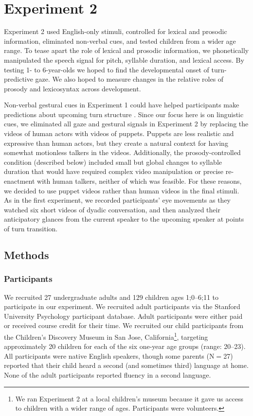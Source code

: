\documentclass[authoryear, 12pt]{elsarticle}
\begin{document}
\section*{Experiment 2}
\label{sec:exp2}

Experiment 2 used English-only stimuli, controlled for lexical and prosodic information, eliminated non-verbal cues, and tested children from a wider age range. To tease apart the role of lexical and prosodic information, we phonetically manipulated the speech signal for pitch, syllable duration, and lexical access. By testing 1- to 6-year-olds we hoped to find the developmental onset of turn-predictive gaze. We also hoped to measure changes in the relative roles of prosody and lexicosyntax across development.

Non-verbal gestural cues in Experiment 1 could have helped participants make predictions about upcoming turn structure \citep{rossano2009, stivers2010}. Since our focus here is on linguistic cues, we eliminated all gaze and gestural signals in Experiment 2 by replacing the videos of human actors with videos of puppets. Puppets are less realistic and expressive than human actors, but they create a natural context for having somewhat motionless talkers in the videos. Additionally, the prosody-controlled condition (described below) included small but global changes to syllable duration that would have required complex video manipulation or precise re-enactment with human talkers, neither of which was feasible. For these reasons, we decided to use puppet videos rather than human videos in the final stimuli. As in the first experiment, we recorded participants' eye movements as they watched six short videos of dyadic conversation, and then analyzed their anticipatory glances from the current speaker to the upcoming speaker at points of turn transition.

\subsection*{Methods}
\label{sec:methods2}

\subsubsection*{Participants}
We recruited 27 undergraduate adults and 129 children ages 1;0--6;11 to participate in our experiment. We recruited adult participants via the Stanford University Psychology participant database. Adult participants were either paid or received course credit for their time. We recruited our child participants from the Children's Discovery Museum in San Jose, California\footnote{We ran Experiment 2 at a local children's museum because it gave us access to children with a wider range of ages. Participants were volunteers.}, targeting approximately 20 children for each of the six one-year age groups (range: 20--23). All participants were native English speakers, though some parents (N$=$27) reported that their child heard a second (and sometimes third) language at home. None of the adult participants reported fluency in a second language.
\end{document}
